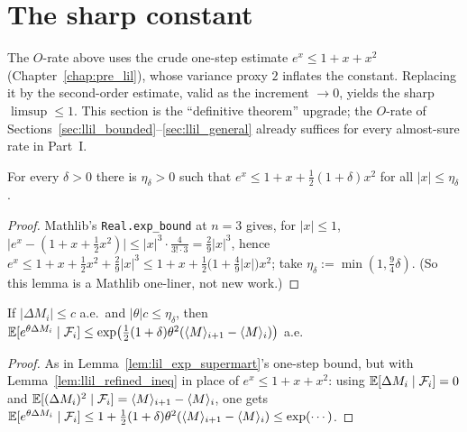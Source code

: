 \section{The sharp constant}
\label{sec:llil_sharp}

The $O$-rate above uses the crude one-step estimate $e^x\le1+x+x^2$
(Chapter~\ref{chap:pre_lil}), whose variance proxy $2$ inflates the constant. Replacing
it by the second-order estimate, valid as the increment $\to0$, yields the sharp
$\limsup\le1$. This section is the ``definitive theorem'' upgrade; the $O$-rate of
Sections~\ref{sec:llil_bounded}--\ref{sec:llil_general} already suffices for every
almost-sure rate in Part~I.

\begin{lemma}\label{lem:llil_refined_ineq}
\leanok
For every $\delta>0$ there is $\eta_\delta>0$ such that $e^x\le1+x+\tfrac12(1+\delta)x^2$
for all $|x|\le\eta_\delta$.
\end{lemma}
\begin{proof}\leanok
Mathlib's \texttt{Real.exp\_bound} at $n=3$ gives, for $|x|\le1$,
$\big|e^x-(1+x+\tfrac12 x^2)\big|\le|x|^3\cdot\tfrac{4}{3!\cdot3}=\tfrac29|x|^3$, hence
$e^x\le1+x+\tfrac12 x^2+\tfrac29|x|^3\le1+x+\tfrac12\big(1+\tfrac49|x|\big)x^2$; take
$\eta_\delta:=\min(1,\tfrac94\delta)$. (So this lemma is a Mathlib one-liner, not new work.)
\end{proof}

\begin{lemma}\label{lem:llil_refined_mgf}
\leanok
{}
If $|\Delta M_i|\le c$ a.e.\ and $|\theta|c\le\eta_\delta$, then
$\mathbb{E}[e^{\theta\Delta M_i}\mid\mathcal{F}_i]\le\exp\!\big(\tfrac12(1+\delta)\theta^2
(\langle M\rangle_{i+1}-\langle M\rangle_i)\big)$ a.e.
\end{lemma}
\begin{proof}
As in Lemma~\ref{lem:lil_exp_supermart}'s one-step bound, but with
Lemma~\ref{lem:llil_refined_ineq} in place of $e^x\le1+x+x^2$: using
$\mathbb{E}[\Delta M_i\mid\mathcal{F}_i]=0$ and $\mathbb{E}[(\Delta M_i)^2\mid\mathcal{F}_i]=\langle M\rangle_{i+1}
-\langle M\rangle_i$, one gets
$\mathbb{E}[e^{\theta\Delta M_i}\mid\mathcal{F}_i]\le1+\tfrac12(1+\delta)\theta^2
(\langle M\rangle_{i+1}-\langle M\rangle_i)\le\exp(\cdots)$.
\end{proof}

